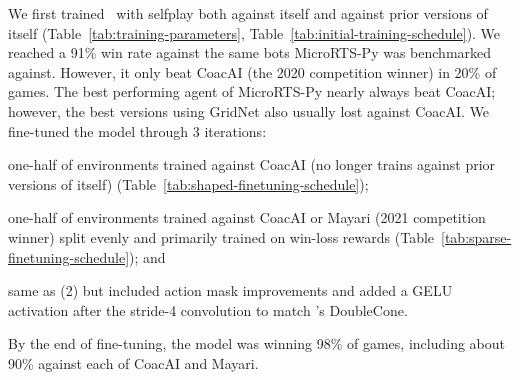 \documentclass{article}
\begin{document}
We first trained \agentName\ with selfplay both against itself and against prior
versions of itself (Table~\ref{tab:training-parameters},
Table~\ref{tab:initial-training-schedule}). We reached a 91\% win rate against the same bots MicroRTS-Py was
benchmarked against. However, it only beat CoacAI (the 2020 competition winner) in 20\%
of games. The best performing agent of MicroRTS-Py nearly always beat CoacAI; however,
the best versions using GridNet also usually lost against CoacAI. We fine-tuned
the model through 3 iterations:
\begin{inparaenum}[(1)]
    \item one-half of environments trained against CoacAI (no longer trains against
    prior versions of itself) (Table~\ref{tab:shaped-finetuning-schedule});
    \item one-half of environments trained against CoacAI or Mayari (2021 competition
    winner) split evenly and primarily trained on win-loss rewards (Table~\ref{tab:sparse-finetuning-schedule}); and
    \item same as (2) but included action mask improvements and added a GELU activation
    after the stride-4 convolution to match \citet{Ferdinand2021doublecone}'s DoubleCone.
\end{inparaenum}
By the end of fine-tuning, the model was winning 98\% of games, including about 90\%
against each of CoacAI and Mayari.
\end{document}
